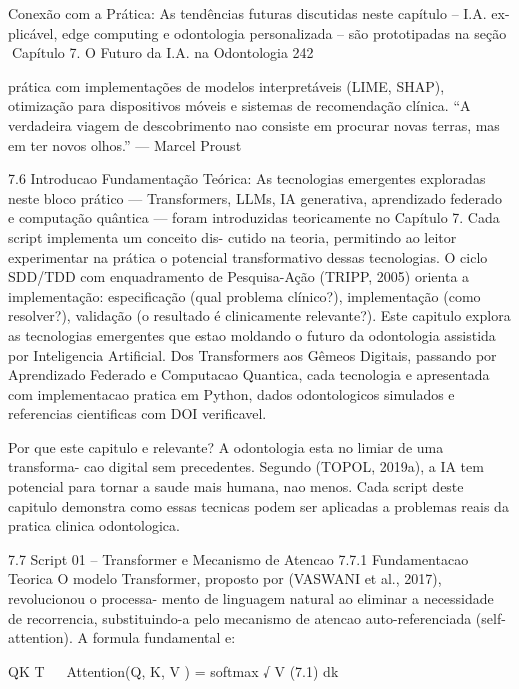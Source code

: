 Conexão com a Prática: As tendências futuras discutidas neste capítulo – I.A. ex-
plicável, edge computing e odontologia personalizada – são prototipadas na seção
Capítulo 7. O Futuro da I.A. na Odontologia                                          242


prática com implementações de modelos interpretáveis (LIME, SHAP), otimização para
dispositivos móveis e sistemas de recomendação clínica.
      “A verdadeira viagem de descobrimento nao consiste em procurar novas terras,
mas em ter novos olhos.” — Marcel Proust


7.6      Introducao
Fundamentação Teórica: As tecnologias emergentes exploradas neste bloco prático
— Transformers, LLMs, IA generativa, aprendizado federado e computação quântica —
foram introduzidas teoricamente no Capítulo 7. Cada script implementa um conceito dis-
cutido na teoria, permitindo ao leitor experimentar na prática o potencial transformativo
dessas tecnologias. O ciclo SDD/TDD com enquadramento de Pesquisa-Ação (TRIPP,
2005) orienta a implementação: especificação (qual problema clínico?), implementação
(como resolver?), validação (o resultado é clinicamente relevante?).
         Este capitulo explora as tecnologias emergentes que estao moldando o futuro
da odontologia assistida por Inteligencia Artificial. Dos Transformers aos Gêmeos
Digitais, passando por Aprendizado Federado e Computacao Quantica, cada tecnologia
e apresentada com implementacao pratica em Python, dados odontologicos simulados
e referencias cientificas com DOI verificavel.

   Por que este capitulo e relevante? A odontologia esta no limiar de uma transforma-
   cao digital sem precedentes. Segundo (TOPOL, 2019a), a IA tem potencial para
   tornar a saude mais humana, nao menos. Cada script deste capitulo demonstra
   como essas tecnicas podem ser aplicadas a problemas reais da pratica clinica
   odontologica.


7.7      Script 01 – Transformer e Mecanismo de Atencao
7.7.1     Fundamentacao Teorica
O modelo Transformer, proposto por (VASWANI et al., 2017), revolucionou o processa-
mento de linguagem natural ao eliminar a necessidade de recorrencia, substituindo-a
pelo mecanismo de atencao auto-referenciada (self-attention).
         A formula fundamental e:

                                                              QK T
                                                                    
                          Attention(Q, K, V ) = softmax       √          V         (7.1)
                                                                dk

